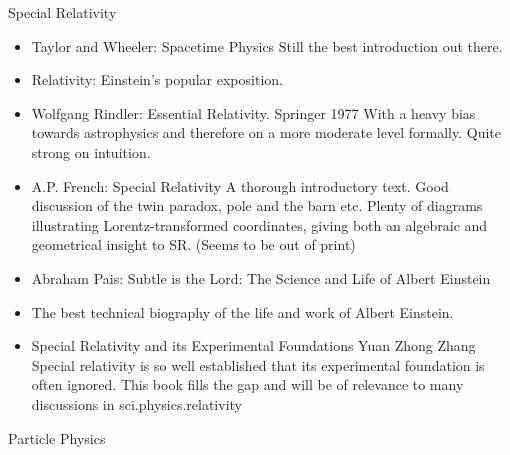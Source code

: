 \documentclass[10pt,a4paper]{book}
\theoremstyle{definition}
\begin{document}
Special Relativity

\begin{itemize}
\item Taylor and Wheeler: Spacetime Physics Still the best introduction out there.
\item Relativity: Einstein's popular exposition.
\item Wolfgang Rindler: Essential Relativity.  Springer 1977
With a heavy bias towards astrophysics and therefore on a more moderate level formally.  Quite strong on intuition.
\item A.P. French: Special Relativity
A thorough introductory text.  Good discussion of the twin paradox, pole and the barn etc.  Plenty of diagrams illustrating Lorentz-transformed coordinates, giving both an algebraic and geometrical insight to SR.  (Seems to be out of print)
\item Abraham Pais: Subtle is the Lord: The Science and Life of Albert Einstein
\item The best technical biography of the life and work of Albert Einstein.
\item Special Relativity and its Experimental Foundations Yuan Zhong Zhang
Special relativity is so well established that its experimental foundation is often ignored.  This book fills the gap and will be of relevance to many discussions in sci.physics.relativity
\end{itemize}


Particle Physics
\end{document}
